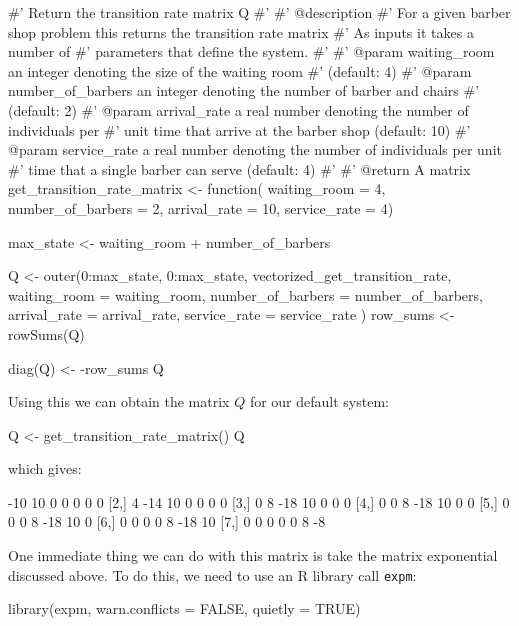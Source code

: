 \begin{Rin}
#' Return the transition rate matrix Q
#'
#' @description
#' For a given barber shop problem this returns the transition rate matrix
#' As inputs it takes a number of
#' parameters that define the system.
#'
#' @param waiting_room an integer denoting the size of the waiting room
#' (default: 4)
#' @param number_of_barbers an integer denoting the number of barber and chairs
#' (default: 2)
#' @param arrival_rate a real number denoting the number of individuals per
#' unit time that arrive at the barber shop (default: 10)
#' @param service_rate a real number denoting the number of individuals per unit
#' time that a single barber can serve (default: 4)
#'
#' @return A matrix
get_transition_rate_matrix <- function(
                                       waiting_room = 4,
                                       number_of_barbers = 2,
                                       arrival_rate = 10,
                                       service_rate = 4) {
  max_state <- waiting_room + number_of_barbers

  Q <- outer(0:max_state,
    0:max_state,
    vectorized_get_transition_rate,
    waiting_room = waiting_room,
    number_of_barbers = number_of_barbers,
    arrival_rate = arrival_rate,
    service_rate = service_rate
  )
  row_sums <- rowSums(Q)

  diag(Q) <- -row_sums
  Q
}
\end{Rin}

Using this we can obtain the matrix \(Q\) for our default system:

\begin{Rin}
Q <- get_transition_rate_matrix()
Q
\end{Rin}

which gives:

\begin{Rout}
     [,1] [,2] [,3] [,4] [,5] [,6] [,7]
[1,]  -10   10    0    0    0    0    0
[2,]    4  -14   10    0    0    0    0
[3,]    0    8  -18   10    0    0    0
[4,]    0    0    8  -18   10    0    0
[5,]    0    0    0    8  -18   10    0
[6,]    0    0    0    0    8  -18   10
[7,]    0    0    0    0    0    8   -8
\end{Rout}

One immediate thing we can do with this matrix is take the matrix exponential
discussed above. To do this, we need to use an R library call
\texttt{expm}:

\begin{Rin}
library(expm, warn.conflicts = FALSE, quietly = TRUE)
\end{Rin}

